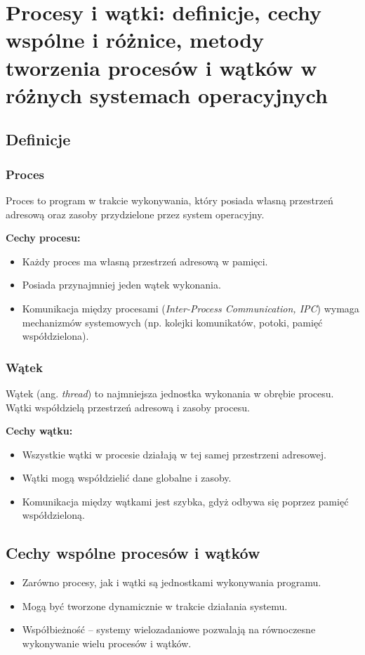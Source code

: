 \section{Procesy i wątki: definicje, cechy wspólne i różnice, metody tworzenia procesów i wątków w różnych systemach operacyjnych}

\subsection{Definicje}

\subsubsection{Proces}
Proces to program w trakcie wykonywania, który posiada własną przestrzeń adresową oraz zasoby przydzielone przez system operacyjny.

\textbf{Cechy procesu:}
\begin{itemize}
    \item Każdy proces ma własną przestrzeń adresową w pamięci.
    \item Posiada przynajmniej jeden wątek wykonania.
    \item Komunikacja między procesami (\textit{Inter-Process Communication, IPC}) wymaga mechanizmów systemowych (np. kolejki komunikatów, potoki, pamięć współdzielona).
\end{itemize}

\subsubsection{Wątek}
Wątek (ang. \textit{thread}) to najmniejsza jednostka wykonania w obrębie procesu. Wątki współdzielą przestrzeń adresową i zasoby procesu.

\textbf{Cechy wątku:}
\begin{itemize}
    \item Wszystkie wątki w procesie działają w tej samej przestrzeni adresowej.
    \item Wątki mogą współdzielić dane globalne i zasoby.
    \item Komunikacja między wątkami jest szybka, gdyż odbywa się poprzez pamięć współdzieloną.
\end{itemize}

\subsection{Cechy wspólne procesów i wątków}
\begin{itemize}
    \item Zarówno procesy, jak i wątki są jednostkami wykonywania programu.
    \item Mogą być tworzone dynamicznie w trakcie działania systemu.
    \item Współbieżność – systemy wielozadaniowe pozwalają na równoczesne wykonywanie wielu procesów i wątków.
\end{itemize}

